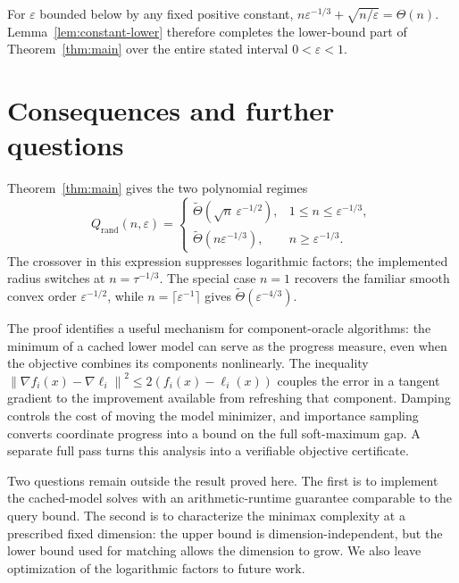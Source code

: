 \documentclass[11pt,a4paper]{article}
\theoremstyle{definition}\newtheorem{definition}[theorem]{Definition}
\theoremstyle{remark}\newtheorem{remark}[theorem]{Remark}
\newcommand{\eps}{\varepsilon}
\newcommand{\norm}[1]{\left\|#1\right\|}
\newcommand{\tTheta}{\widetilde\Theta}
\newcommand{\Q}{Q_{\mathrm{rand}}}
\begin{document}
For $\eps$ bounded below by any fixed positive constant,
$n\eps^{-1/3}+\sqrt{n/\eps}=\Theta(n)$. Lemma~\ref{lem:constant-lower}
therefore completes the lower-bound part of Theorem~\ref{thm:main} over
the entire stated interval $0<\eps<1$.

\section{Consequences and further questions}\label{sec:discussion}
Theorem~\ref{thm:main} gives the two polynomial regimes
\begin{equation}\label{eq:phase}
 \Q(n,\eps)=
 \begin{cases}
  \tTheta(\sqrt n\,\eps^{-1/2}),&1\le n\le\eps^{-1/3},\\[2pt]
  \tTheta(n\eps^{-1/3}),&n\ge\eps^{-1/3}.
 \end{cases}
\end{equation}
The crossover in this expression suppresses logarithmic factors;
the implemented radius switches at $n=\tau^{-1/3}$. The special case
$n=1$ recovers the familiar smooth convex order $\eps^{-1/2}$, while
$n=\lceil\eps^{-1}\rceil$ gives $\tTheta(\eps^{-4/3})$.

The proof identifies a useful mechanism for component-oracle algorithms:
the minimum of a cached lower model can serve as the progress measure,
even when the objective combines its components nonlinearly. The inequality
$\norm{\nabla f_i(x)-\nabla\ell_i}^2\le2(f_i(x)-\ell_i(x))$
couples the error in a tangent gradient to the improvement available from
refreshing that component. Damping controls the cost of moving the model
minimizer, and importance sampling converts coordinate progress into a
bound on the full soft-maximum gap. A separate full pass turns this
analysis into a verifiable objective certificate.

Two questions remain outside the result proved here. The first is to
implement the cached-model solves with an arithmetic-runtime guarantee
comparable to the query bound. The second is to characterize the minimax
complexity at a prescribed fixed dimension: the upper bound is
dimension-independent, but the lower bound used for matching allows the
dimension to grow. We also leave optimization of the logarithmic factors
to future work.
\end{document}
